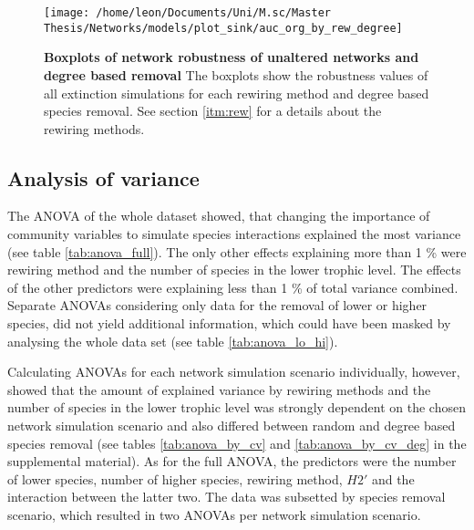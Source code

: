 \documentclass[12pt,a4paper]{article}
\begin{document}


\begin{figure}[H]
	 \centering
	 \texttt{[image: /home/leon/Documents/Uni/M.sc/Master Thesis/Networks/models/plot\_sink/auc\_org\_by\_rew\_degree]}
	 \captionsetup{width = \textwidth}
	 \caption[Boxplots of network robustness of unaltered networks and degree based removal]{\textbf{Boxplots of network robustness of unaltered networks and degree based removal} The boxplots show the robustness values of all extinction simulations for each rewiring method and degree based species removal. See section \ref{itm:rew} for a details about the rewiring methods.}
	 \label{fig:auc_org_rew_deg}
\end{figure}

\subsection{Analysis of variance}

The ANOVA of the whole dataset showed, that changing the importance of community variables to simulate species interactions explained the most variance (see table \ref{tab:anova_full}). The only other effects explaining more than 1 \% were rewiring method and the number of species in the lower trophic level. The effects of the other predictors were explaining less than 1 \% of total variance combined. Separate ANOVAs considering only data for the removal of lower or higher species, did not yield additional information, which could have been masked by analysing the whole data set (see table \ref{tab:anova_lo_hi}).\par


Calculating ANOVAs for each network simulation scenario individually, however, showed that the amount of explained variance by rewiring methods and the number of species in the lower trophic level was strongly dependent on the chosen network simulation scenario and also differed between random and degree based species removal (see tables \ref{tab:anova_by_cv} and \ref{tab:anova_by_cv_deg} in the supplemental material). As for the full ANOVA, the predictors were the number of lower species, number of higher species, rewiring method, $H2'$ and the interaction between the latter two. The data was subsetted by species removal scenario, which resulted in two ANOVAs per network simulation scenario. 
\end{document}

